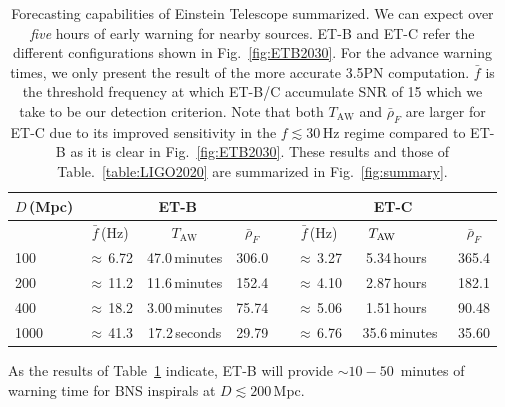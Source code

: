 \documentclass[amsmath,amssymb,aps,floats,amsfonts,notitlepage,superscriptaddress,eqsecnum,nofootinbib,10pt]{revtex4-1}
\newcommand\T{\rule{0pt}{2.6ex}}       %
\newcommand\B{\rule[-1.2ex]{0pt}{0pt}} %
\begin{document}
\begin{table}[h]
\centering
\begin{tabular}{l|ccccccc}
\hline
$D\,$(Mpc) & \multicolumn{3}{c}{ET-B} &  & \multicolumn{3}{c}{ET-C}\T\B\\
\hline
{}& $\bar{f}\,$(Hz) & \ \hspace{7mm} $T_\text{AW}$ \ \hspace{7mm} & $\bar{\rho}_{F}$ &{} & $\bar{f}\,$(Hz) & \ \hspace{5mm} $T_\text{AW}\hspace{12mm}$& $\bar{\rho}_{F}$\T\B\\
100 & $\approx\,$6.72 &  47.0\,minutes & 306.0 &{\qquad} & $\approx\,$3.27 & 5.34\,hours\ & 365.4\T\\
200 & $\approx\,$11.2 & 11.6\,minutes & 152.4 &{\qquad} & $\approx\,$4.10 & 2.87\,hours\ & 182.1 \\
400 & $\approx\,$18.2 & 3.00\,minutes & 75.74 &{\qquad} & $\approx\,$5.06 & 1.51\,hours\ & 90.48\\
1000 & $\approx\,$41.3 &17.2\,seconds & 29.79& \qquad &    $\approx\,$6.76 & 35.6\,minutes & 35.60  \\
\hline
\end{tabular}
\caption{Forecasting capabilities of Einstein Telescope summarized. We can expect over \emph{five} hours of early warning for nearby sources. 
ET-B and ET-C refer the different configurations shown in Fig.~\ref{fig:ETB2030}. For the advance warning times, we only present the result of the more accurate 3.5PN computation. $\bar{f}$ is the threshold frequency at which
ET-B/C accumulate SNR of 15 which we take to be our detection criterion. Note that both $T_\text{AW}$ and $\bar\rho_F$ are larger for ET-C
due to its improved sensitivity in the $f\lesssim 30\,$Hz regime compared to ET-B as it is clear in Fig.~\ref{fig:ETB2030}.
These results and those of Table.~\ref{table:LIGO2020} are summarized in Fig.~\ref{fig:summary}.}\label{table:ET}
\end{table}
%
%
As the results of Table~\ref{table:ET} indicate, ET-B will provide $\sim 10 - 50\,$ minutes of warning time for BNS inspirals at $D\lesssim 200\,$Mpc.
\end{document}
